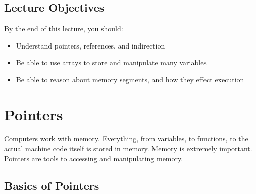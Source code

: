 \documentclass{article}
\title{}
\author{Ryan Baker}
\date{\today}
\begin{document}
\maketitle
\tableofcontents
\pagebreak

\subsection*{Lecture Objectives}

\noindent By the end of this lecture, you should:
\begin{itemize}
	\item Understand pointers, references, and indirection
	\item Be able to use arrays to store and manipulate many variables
	\item Be able to reason about memory segments, and how they effect execution
\end{itemize}

\section{Pointers}

\noindent
Computers work with memory. Everything, from variables, to functions, to the actual machine code itself is stored in memory. Memory is extremely important. Pointers are tools to accessing and manipulating memory.

\subsection{Basics of Pointers}
\end{document}
